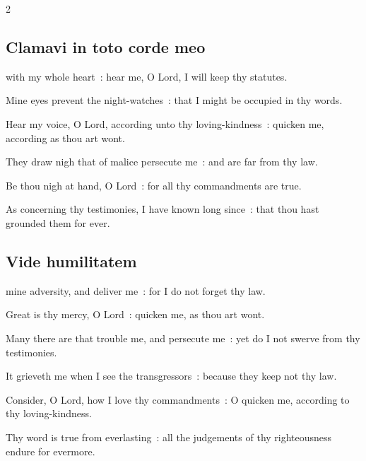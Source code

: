 \begin{multicols}{2}
\subsection{Clamavi in toto corde meo}
 with my whole heart~: hear me, O Lord, I will keep thy statutes.\par
{}
Mine eyes prevent the night-watches~: that I might be occupied in thy words.\par
{}Hear my voice, O Lord, according unto thy loving-kindness~: quicken me, according as thou art wont.\par
{}They draw nigh that of malice persecute me~: and are far from thy law.\par
{}Be thou nigh at hand, O Lord~: for all thy commandments are true.\par
{}As concerning thy testimonies, I have known long since~: that thou hast grounded them for ever.\par

\subsection{Vide humilitatem}


 mine adversity, and deliver me~: for I do not forget thy law.\par
{}
Great is thy mercy, O Lord~: quicken me, as thou art wont.\par
{}Many there are that trouble me, and persecute me~: yet do I not swerve from thy testimonies.\par
{}It grieveth me when I see the transgressors~: because they keep not thy law.\par
{}Consider, O Lord, how I love thy commandments~: O quicken me, according to thy loving-kindness.\par
{}Thy word is true from everlasting~: all the judgements of thy righteousness endure for evermore.\par


\end{multicols}

